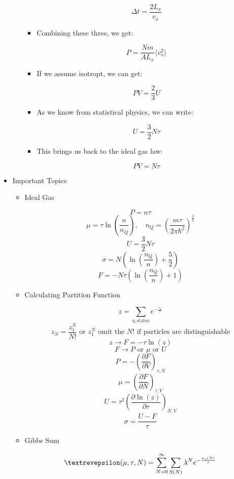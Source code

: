 \begin{itemize}
\begin{itemize}
\begin{itemize}
            $$\Delta t=\frac{2 L_x}{v_x}$$

          \item Combining these three, we get:

            $$P=\frac{Nm}{AL_x}\langle v_x^2\rangle$$

          \item If we assume isotropt, we can get:

            $$PV=\frac{2}{3}U$$

          \item As we know from statistical physics, we can write:

            $$U=\frac{3}{2}N\tau$$

          \item This brings us back to the ideal gas law:

            $$PV=N\tau$$

        \end{itemize}

    \end{itemize}

  \item Important Topics

    \begin{itemize}

      \item Ideal Gas

        $$P=n\tau$$
        $$\mu=\tau\ln\left( \frac{n}{n_Q} \right),\quad n_Q=\left( \frac{m\tau}{2\pi\hbar^2} \right)^{\frac{3}{2}}$$
        $$U=\frac{3}{2}N\tau$$
        $$\sigma=N\left( \ln\left( \frac{n_Q}{n} \right)+\frac{5}{2} \right)$$
        $$F=-N\tau\left( \ln\left( \frac{n_Q}{n} \right)+1 \right)$$

      \item Calculating Partition Function

        $$z=\sum_{\text{q states}}e^{-\frac{\varepsilon_n}{\tau}}$$
        $$z_N=\frac{z_1^N}{N!}\text{ or }z_1^N\text{ omit the $N!$ if particles are distinguishable}$$
        $$z\to F=-\tau\ln(z)$$
        $$F\to P\text{ or }\mu\text{ or }U$$
        $$P=-\left( \frac{\partial F}{\partial V} \right)_{\tau,N}$$
        $$\mu=\left( \frac{\partial F}{\partial N} \right)_{\tau,V}$$
        $$U=\tau^2\left( \frac{\partial \ln(z)}{\partial \tau} \right)_{N,V}$$
        $$\sigma=\frac{U-F}{\tau}$$

      \item Gibbs Sum

        $$\text{\textrevepsilon}(\mu,\tau,N)=\sum_{N=0}^\infty\sum_{S(N)}\lambda^Ne^{-\frac{\varepsilon_s(N)}{\tau}}$$


\end{itemize}
\end{itemize}
